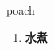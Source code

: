
\begin{frame}
{\huge poach}
\begin{center}
\begin{enumerate}\Large
  \item \textbf{水煮}
\end{enumerate}
\end{center}
\end{frame}
